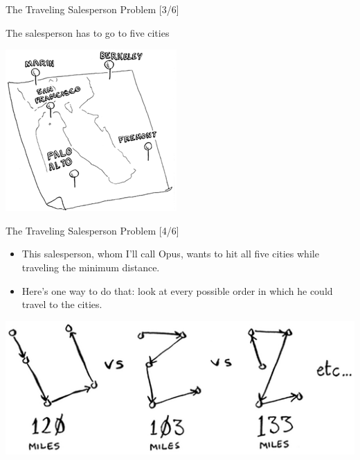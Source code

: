 \documentclass[ignorenonframetext,]{beamer}
\providecommand{\tightlist}{%
  \setlength{\itemsep}{0pt}\setlength{\parskip}{0pt}}
\begin{document}
\begin{frame}{The Traveling Salesperson Problem {[}3/6{]}}
\protect\hypertarget{the-traveling-salesperson-problem-36}{}

The salesperson has to go to five cities

\includegraphics{./Chapter01-figure/travelling_salesperson_02.png}

\end{frame}

\begin{frame}{The Traveling Salesperson Problem {[}4/6{]}}
\protect\hypertarget{the-traveling-salesperson-problem-46}{}

\begin{itemize}
\tightlist
\item
  This salesperson, whom I'll call Opus, wants to hit all five cities
  while traveling the minimum distance.
\item
  Here's one way to do that: look at every possible order in which he
  could travel to the cities.
\end{itemize}

\includegraphics{./Chapter01-figure/travelling_salesperson_03.png}

\end{frame}
\end{document}
